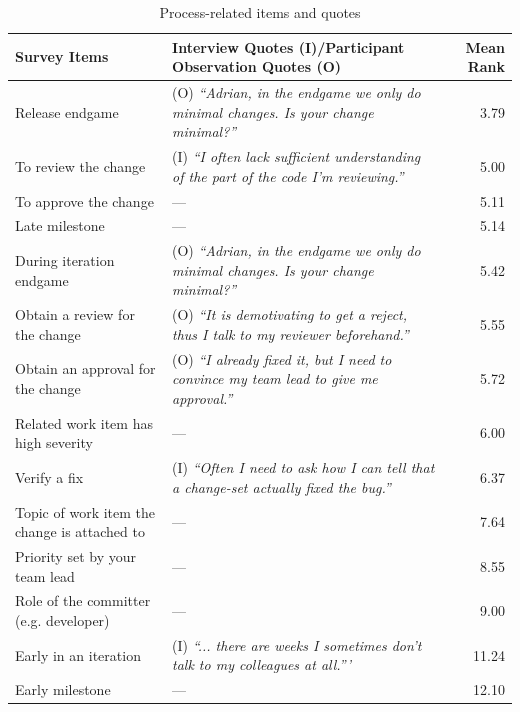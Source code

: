 \begin{table}
\centering
\small
\centering
\begin{tabular}{l@{\hspace{7pt}}l@{\hspace{-20pt}}r}
\toprule
Survey Items & Interview Quotes (I)/Participant Observation Quotes (O) & Mean Rank\\
\midrule
Release endgame & (O) \emph{``Adrian, in the endgame we only do minimal changes. Is your change minimal?''}& 3.79\\%
To review the change &(I) \emph{``I often lack sufficient understanding of the part of the code I'm reviewing.''}& 5.00\\%
To approve the change &--- & 5.11\\%
Late milestone &--- & 5.14\\%
During iteration endgame &(O) \emph{``Adrian, in the endgame we only do minimal changes. Is your change minimal?''}& 5.42\\%
Obtain a review for the change &(O) \emph{``It is demotivating to get a reject, thus I talk to my reviewer beforehand.''}& 5.55\\%
Obtain an approval for the change &(O) \emph{``I already fixed it, but I  need to convince my team lead to give me approval.''}& 5.72\\%
Related work item has high severity &--- & 6.00\\%
Verify a fix &(I) \emph{``Often I need to ask how I can tell that a change-set actually fixed the bug.''}& 6.37\\%
Topic of work item the change is attached to &--- & 7.64\\%
Priority set by your team lead&--- & 8.55\\%
Role of the committer (e.g. developer) &--- & 9.00\\%
Early in an iteration &(I) \emph{``... there are weeks I sometimes don't talk to my colleagues at all.'''}& 11.24\\%
Early milestone &--- & 12.10\\%
\bottomrule
\end{tabular}
\caption{Process-related items and quotes}
\label{tab:sub-process}
\end{table}

